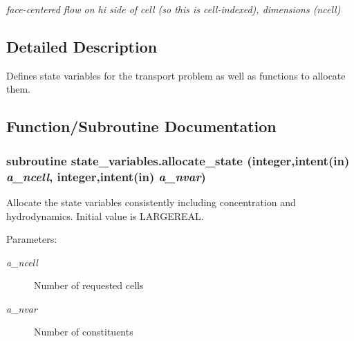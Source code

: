 \begin{CompactItemize}
\begin{CompactList}\small\item\em face-centered flow on hi side of cell (so this is cell-indexed), dimensions (ncell) \item\end{CompactList}\end{CompactItemize}


\subsection{Detailed Description}
Defines state variables for the transport problem as well as functions to allocate them. 



\subsection{Function/Subroutine Documentation}
\hypertarget{a00070_02b466d6d8eb478ddb781a15f2d9c6d8}{
\subsubsection[{allocate\_\-state}]{\setlength{\rightskip}{0pt plus 5cm}subroutine state\_\-variables.allocate\_\-state (integer,intent(in) {\em a\_\-ncell}, \/  integer,intent(in) {\em a\_\-nvar})}}
\label{a00070_02b466d6d8eb478ddb781a15f2d9c6d8}


Allocate the state variables consistently including concentration and hydrodynamics. Initial value is LARGEREAL. 

\begin{Desc}
\item[Parameters:]
\begin{description}
\item[{\em a\_\-ncell}]Number of requested cells\item[{\em a\_\-nvar}]Number of constituents \end{description}
\end{Desc}
